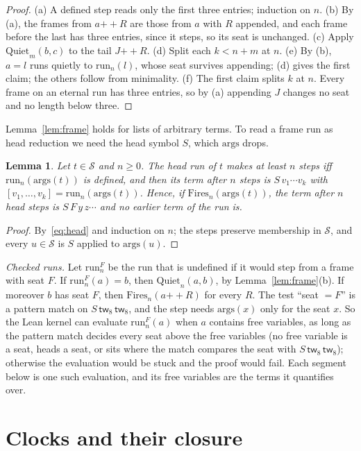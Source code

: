 \documentclass[11pt]{amsart}
\newtheorem{lemma}[theorem]{Lemma}
\theoremstyle{definition}
\newcommand{\Ter}{\mathcal S}
\newcommand{\app}{\mathbin{+\!\!+}}
\newcommand{\args}{\mathrm{args}}
\newcommand{\tw}[1]{\mathsf{tw}_{#1}}
\newcommand{\run}{\mathrm{run}}
\newcommand{\Fires}{\mathrm{Fires}}
\newcommand{\Quiet}{\mathrm{Quiet}}
\begin{document}
\begin{proof}
(a) A defined step reads only the first three entries; induction on $n$. (b) By (a), the frames
from $a\app R$ are those from $a$ with $R$ appended, and each frame before the last has three
entries, since it steps, so its seat is unchanged. (c) Apply $\Quiet_m(b,c)$ to the tail $J\app R$.
(d) Split each $k<n+m$ at $n$. (e) By (b), $a=l$ runs quietly to $\run_n(l)$, whose seat survives
appending; (d) gives the first claim; the others follow from minimality. (f) The first claim splits
$k$ at $n$. Every frame on an eternal run has three entries, so by (a) appending $J$ changes no
seat and no length below three.
\end{proof}

Lemma~\ref{lem:frame} holds for lists of arbitrary terms. To read a frame run as head reduction we
need the head symbol $S$, which $\args$ drops.

\begin{lemma}\label{lem:bridge}
Let $t\in\Ter$ and $n\ge0$. The head run of $t$ makes at least $n$ steps iff $\run_n(\args(t))$ is
defined, and then its term after $n$ steps is $S\,v_1\cdots v_k$ with
$[v_1,\dots,v_k]=\run_n(\args(t))$. Hence, if $\Fires_n(\args(t))$, the term after $n$ head
steps is $S\,F\,y\,z\cdots$ and no earlier term of the run is.
\end{lemma}

\begin{proof}
By~\eqref{eq:head} and induction on $n$; the steps preserve membership in $\Ter$, and every
$u\in\Ter$ is $S$ applied to $\args(u)$.
\end{proof}

\emph{Checked runs.} Let $\run^F_n$ be the run that is undefined if it would step from a frame with
seat $F$. If $\run^F_n(a)=b$, then $\Quiet_n(a,b)$, by Lemma~\ref{lem:frame}(b). If moreover $b$
has seat $F$, then $\Fires_n(a\app R)$ for every $R$. The test ``seat $=F$'' is a pattern match on
$S\,\tw8\,\tw8$, and the step needs $\args(x)$ only for the seat $x$. So the Lean kernel can
evaluate $\run^F_n(a)$ when $a$ contains free variables, as long as the pattern match decides every
seat above the free variables (no free variable is a seat, heads a seat, or sits where the match
compares the seat with $S\,\tw8\,\tw8$); otherwise the evaluation would be stuck and the proof
would fail. Each segment below is one such evaluation, and its free variables are the terms it
quantifies over.

\section{Clocks and their closure}\label{sec:closure}
\end{document}
